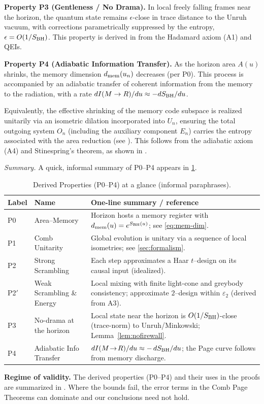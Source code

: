 \documentclass[a4paper,11pt]{article}
\newenvironment{boxedresult}[1]{\begin{infobox}\noindent\textbf{#1.}}{\end{infobox}}
\theoremstyle{plain}
\theoremstyle{definition}
\theoremstyle{remark}
\begin{document}
\textbf{Property P3 (Gentleness / No Drama).}
In local freely falling frames near the horizon, the quantum state remains $\epsilon$-close in trace distance to the Unruh vacuum, with corrections parametrically suppressed by the entropy, $\epsilon=O(1/S_{\rm BH})$.
This property is derived in  from the Hadamard axiom (A1) and QEIs.


\textbf{Property P4 (Adiabatic Information Transfer).}
As the horizon area $A(u)$ shrinks, the memory dimension $d_{\rm mem}(u_n)$ decreases (per P0). This process is accompanied by an adiabatic transfer of coherent information from the memory to the radiation, with a rate $dI(M\to R)/du \approx -dS_{\rm BH}/du$.

Equivalently, the effective shrinking of the memory code subspace is realized unitarily via an isometric dilation incorporated into $U_n$, ensuring the total outgoing system $O_n$ (including the auxiliary component $E_n$) carries the entropy associated with the area reduction (see ).
This follows from the adiabatic axiom (A4) and Stinespring's theorem, as shown in .

\noindent\emph{Summary.} A quick, informal summary of P0--P4 appears in \cref{tab:postulates_glance}.

\begin{table}[htbp]
\centering
\caption{Derived Properties (P0--P4) at a glance (informal paraphrases).}
\label{tab:postulates_glance}
\footnotesize
\setlength{\tabcolsep}{4pt}
\begin{tabularx}{\textwidth}{@{}l l X@{}}
\toprule
\textbf{Label} & \textbf{Name} & \textbf{One-line summary / reference}\\
\midrule
P0 & Area--Memory & Horizon hosts a memory register with $d_{\rm mem}(u)=e^{S_{\rm BH}(u)}$; see \eqref{eq:mem-dim}.\\
P1 & Comb Unitarity & Global evolution is unitary via a sequence of local isometries; see \cref{sec:formalism}.\\
P2 & Strong Scrambling & Each step approximates a Haar $t$--design on its causal input (idealized).\\
P2$'$ & Weak Scrambling \& Energy & Local mixing with finite light-cone and greybody consistency; approximate $2$--design within $\varepsilon_2$ (derived from A3).\\
P3 & No-drama at the horizon & Local state near the horizon is $O(1/S_{\rm BH})$-close (trace-norm) to Unruh/Minkowski; Lemma~\ref{lem:nofirewall}.\\
P4 & Adiabatic Info Transfer & $dI(M\!\to\!R)/du \approx -\,dS_{\rm BH}/du$; the Page curve follows from memory discharge.\\
\bottomrule
\end{tabularx}
\end{table}
\begin{boxedresult}{Regime of validity}
The derived properties (P0--P4) and their uses in the proofs are summarized in . Where the bounds fail, the error terms in the Comb Page Theorems can dominate and our conclusions need not hold.
\end{boxedresult}
\end{document}
